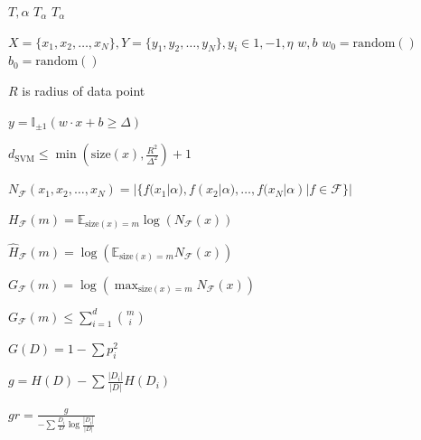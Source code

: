 \documentclass[twocolumn]{ctexart}
\begin{document}
\begin{algorithm}
  \caption{}%
  \label{al:cut}
  \begin{algorithmic}
    \REQUIRE$T, \alpha$
    \ENSURE$T_\alpha$
    \ENDFOR%
    \RETURN$T_\alpha$
  \end{algorithmic}
\end{algorithm}
\begin{algorithm}
  \caption{}%
  \label{al:perceptron}
  \begin{algorithmic}
    \REQUIRE$X = \{x_1, x_2, \ldots, x_N\}, Y = \{y_1, y_2, \ldots, y_N\}, y_i \in {1, -1}, \eta$
    \ENSURE$w, b$
    \STATE$w_0 = \mathrm{random}()$
    \STATE$b_0 = \mathrm{random}()$
  \end{algorithmic}
\end{algorithm}


$R$ is radius of data point

$y = \mathbb{I}_{\pm1}(w \cdot x + b \geqslant \Delta)$

$d_\mathrm{SVM} \leqslant \min(\mathrm{size}(x), \frac{R^2}{\Delta^2}) + 1$

$N_\mathscr{F}(x_1, x_2, \ldots, x_N) = |\{f(x_1|\alpha), f(x_2|\alpha),
\ldots, f(x_N|\alpha)|f \in \mathscr{F}\}|$

$H_\mathscr{F}(m) = \mathbb{E}_{\mathrm{size}(x) = m}\log(N_\mathscr{F}(x))$

$\hat{H}_\mathscr{F}(m) = \log(\mathbb{E}_{\mathrm{size}(x) = m}N_\mathscr{F}(x))$

$G_\mathscr{F}(m) = \log(\max_{\mathrm{size}(x) = m}N_\mathscr{F}(x))$

$G_\mathscr{F}(m) \leqslant \sum_{i = 1}^d \binom{m}{i}$

$G(D) = 1 - \sum p_i^2$

$g = H(D) - \sum\frac{|D_i|}{|D|}H(D_i)$

$gr = \frac{g}{-\sum\frac{D_i}{D}\log\frac{|D_i|}{|D|}}$
\end{document}
